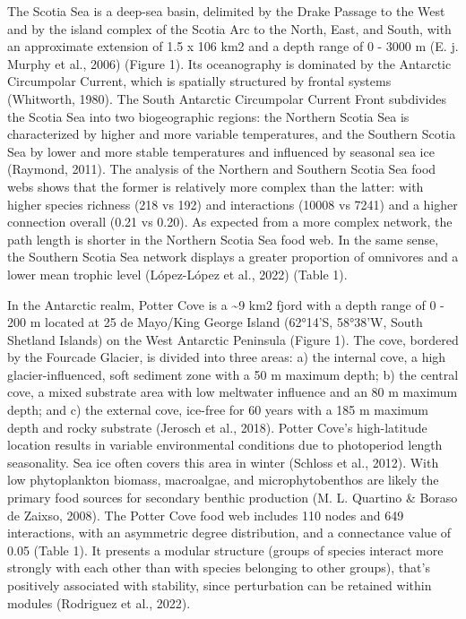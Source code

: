 \documentclass[
]{article}
\begin{document}
The Scotia Sea is a deep-sea basin, delimited by the Drake Passage to
the West and by the island complex of the Scotia Arc to the North, East,
and South, with an approximate extension of 1.5 x 106 km2 and a depth
range of 0 - 3000 m (E. j. Murphy et al., 2006) (Figure 1). Its
oceanography is dominated by the Antarctic Circumpolar Current, which is
spatially structured by frontal systems (Whitworth, 1980). The South
Antarctic Circumpolar Current Front subdivides the Scotia Sea into two
biogeographic regions: the Northern Scotia Sea is characterized by
higher and more variable temperatures, and the Southern Scotia Sea by
lower and more stable temperatures and influenced by seasonal sea ice
(Raymond, 2011). The analysis of the Northern and Southern Scotia Sea
food webs shows that the former is relatively more complex than the
latter: with higher species richness (218 vs 192) and interactions
(10008 vs 7241) and a higher connection overall (0.21 vs 0.20). As
expected from a more complex network, the path length is shorter in the
Northern Scotia Sea food web. In the same sense, the Southern Scotia Sea
network displays a greater proportion of omnivores and a lower mean
trophic level (López-López et al., 2022) (Table 1).

In the Antarctic realm, Potter Cove is a \textasciitilde9 km2 fjord with
a depth range of 0 - 200 m located at 25 de Mayo/King George Island
(62°14'S, 58°38'W, South Shetland Islands) on the West Antarctic
Peninsula (Figure 1). The cove, bordered by the Fourcade Glacier, is
divided into three areas: a) the internal cove, a high
glacier-influenced, soft sediment zone with a 50 m maximum depth; b) the
central cove, a mixed substrate area with low meltwater influence and an
80 m maximum depth; and c) the external cove, ice-free for 60 years with
a 185 m maximum depth and rocky substrate (Jerosch et al., 2018). Potter
Cove's high-latitude location results in variable environmental
conditions due to photoperiod length seasonality. Sea ice often covers
this area in winter (Schloss et al., 2012). With low phytoplankton
biomass, macroalgae, and microphytobenthos are likely the primary food
sources for secondary benthic production (M. L. Quartino \& Boraso de
Zaixso, 2008). The Potter Cove food web includes 110 nodes and 649
interactions, with an asymmetric degree distribution, and a connectance
value of 0.05 (Table 1). It presents a modular structure (groups of
species interact more strongly with each other than with species
belonging to other groups), that's positively associated with stability,
since perturbation can be retained within modules (Rodriguez et al.,
2022).
\end{document}
